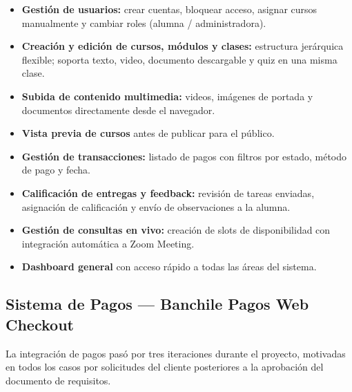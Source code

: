 \documentclass[a4paper,11pt]{article}
\begin{document}
\begin{itemize}[leftmargin=1.6em, itemsep=3pt]
  \item \textbf{Gesti\'on de usuarios:}
        crear cuentas, bloquear acceso, asignar cursos manualmente y cambiar
        roles (alumna / administradora).
  \item \textbf{Creaci\'on y edici\'on de cursos, m\'odulos y clases:}
        estructura jer\'arquica flexible; soporta texto, video, documento descargable
        y quiz en una misma clase.
  \item \textbf{Subida de contenido multimedia:}
        videos, im\'agenes de portada y documentos directamente desde el navegador.
  \item \textbf{Vista previa de cursos} antes de publicar para el p\'ublico.
  \item \textbf{Gesti\'on de transacciones:}
        listado de pagos con filtros por estado, m\'etodo de pago y fecha.
  \item \textbf{Calificaci\'on de entregas y feedback:}
        revisi\'on de tareas enviadas, asignaci\'on de calificaci\'on y env\'io
        de observaciones a la alumna.
  \item \textbf{Gesti\'on de consultas en vivo:}
        creaci\'on de slots de disponibilidad con integraci\'on autom\'atica a Zoom Meeting.
  \item \textbf{Dashboard general} con acceso r\'apido a todas las \'areas del sistema.
\end{itemize}

\subsection{Sistema de Pagos --- Banchile Pagos Web Checkout}
\label{sec:pagos}

La integraci\'on de pagos pas\'o por tres iteraciones durante el proyecto,
motivadas en todos los casos por solicitudes del cliente posteriores a la
aprobaci\'on del documento de requisitos.
\end{document}
